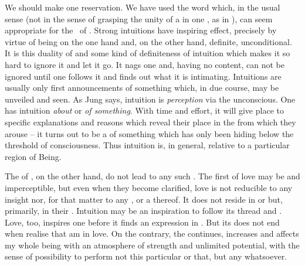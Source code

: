 \pa\label{pa:inspInt} We should make one reservation. We have used the word
 which, in the usual sense (not in the sense of grasping the unity
of a  in one , as in ), can seem appropriate for the
\oss\ of .  Strong intuitions have inspiring effect, precisely by
virtue of being on the one hand  and, on the other hand, definite,
unconditional.  It is this duality of  and some kind of
definiteness of intuition which makes it so hard to ignore it and let it go. It
nags one and, having no  content, can not be ignored
until one follows it and finds out what it is intimating.  Intuitions are
usually only first announcements of something which, in due course, may be
unveiled and seen.  As Jung says, intuition is {\em perception} via the
unconscious. One has intuition {\em about} or {\em of something}.  With time and
effort, it will give place to specific explanations and  reasons
which reveal their place in the  from which they arouse -- it turns
out to be a  of something  which has only been hiding
below the threshold of consciousness.  Thus intuition is, in general, relative to
a particular region of Being.

The  of , on the other hand, do not lead to any such
. The first  of love may be  and
 imperceptible, but even when they become clarified, love is not
reducible to any  insight nor, for that matter to any ,
 or a  thereof.  It does not reside in  or
 but, primarily, in their .
Intuition may be an inspiration to follow its thread and .
Love, too, inspires one before it finds an expression in . But its
 does not end when  realise that  am in love. On the
contrary, the  continues, increases and
affects my whole being with an atmosphere of strength and unlimited potential,
with the sense of possibility to perform not this particular  or that,
but any  whatsoever.

